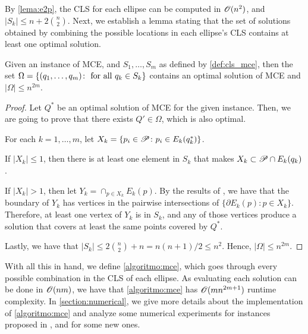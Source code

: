 By \autoref{lema:e2p}, the CLS for each ellipse can be computed in $\mathscr{O}(n^2)$, and $|S_k| \le n + 2\binom{n}{2}$. Next, we establish a lemma stating that the set of solutions obtained by combining the possible locations in each ellipse's CLS contains at least one optimal solution.

\begin{thm}\label{thm:mce}
	Given an instance of MCE, and $S_1, \dots, S_m$ as defined by \autoref{def:cls_mce}, then the set $\Omega = \{(q_1, \dots, q_m) \colon \textnormal{ for all }q_k \in S_k \}$ contains an optimal solution of MCE and $|\Omega| \le n^{2m}$. 
\end{thm}
\begin{proof}
	Let $Q^*$ be an optimal solution of MCE for the given instance. Then, we are going to prove that there exists $Q' \in \Omega$, which is also optimal.
	
	For each $k=1, \dots, m$, let $X_k = \{p_i \in \mathscr{P}\colon p_i \in E_k(q_k^*)\}$.
	
	
	If $|X_k| \le 1$, then there is at least one element in $S_k$ that makes $X_k \subset \mathscr{P} \cap E_k(q_k)$.
	
	If $|X_k| > 1$, then let $Y_k = \cap_{p \in X_k}E_k(p)$. By the results of \cite{bi}, we have that the boundary of $Y_k$ has vertices in the pairwise intersections of $\{\partial E_k(p) \colon p \in X_k\}$. Therefore, at least one vertex of $Y_k$ is in $S_k$, and any of those vertices produce a solution that covers at least the same points covered by $Q^*$.
	
	Lastly, we have that $|S_k| \le 2\binom{n}{2} + n = n(n+1)/2 \le n^2$. Hence, $|\Omega| \le n^{2m}$.
\end{proof}

With all this in hand, we define \autoref{algoritmo:mce}, which goes through every possible combination in the CLS of each ellipse. As evaluating each solution can be done in $\mathscr{O}(nm)$, we have that \autoref{algoritmo:mce} has $\mathscr{O}(mn^{2m+1})$ runtime complexity. 
In \autoref{section:numerical}, we give more details about the implementation of \autoref{algoritmo:mce} and analyze some numerical experiments for instances proposed in \cite{canbolat, andreta}, and for some new ones.

